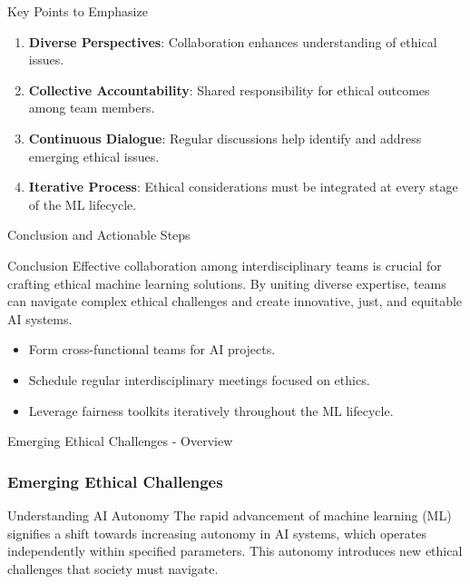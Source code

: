 \documentclass[aspectratio=169]{beamer}
\begin{document}
\begin{frame}[fragile]{Key Points to Emphasize}
    \begin{enumerate}
        \item \textbf{Diverse Perspectives}: Collaboration enhances understanding of ethical issues.
        \item \textbf{Collective Accountability}: Shared responsibility for ethical outcomes among team members.
        \item \textbf{Continuous Dialogue}: Regular discussions help identify and address emerging ethical issues.
        \item \textbf{Iterative Process}: Ethical considerations must be integrated at every stage of the ML lifecycle.
    \end{enumerate}
\end{frame}

\begin{frame}[fragile]{Conclusion and Actionable Steps}
    \begin{block}{Conclusion}
        Effective collaboration among interdisciplinary teams is crucial for crafting ethical machine learning solutions. By uniting diverse expertise, teams can navigate complex ethical challenges and create innovative, just, and equitable AI systems.
    \end{block}
    
    \begin{itemize}
        \item Form cross-functional teams for AI projects.
        \item Schedule regular interdisciplinary meetings focused on ethics.
        \item Leverage fairness toolkits iteratively throughout the ML lifecycle.
    \end{itemize}
\end{frame}

\begin{frame}[fragile]{Emerging Ethical Challenges - Overview}
    \frametitle{Emerging Ethical Challenges}
    \begin{block}{Understanding AI Autonomy}
        The rapid advancement of machine learning (ML) signifies a shift towards increasing autonomy in AI systems, which operates independently within specified parameters. This autonomy introduces new ethical challenges that society must navigate.
    \end{block}
\end{frame}
\end{document}
